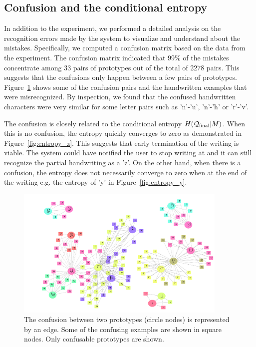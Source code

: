 \documentclass{sigchi}
\begin{document}
\subsection{Confusion and the conditional entropy}

In addition to the experiment, we performed a detailed analysis on the
recognition errors made by the system to visualize and understand
about the mistakes. Specifically, we computed a confusion matrix based
on the data from the experiment. The confusion matrix indicated that
99\% of the mistakes concentrate among 33 pairs of prototypes out of
the total of 2278 pairs. This suggests that the confusions only happen
between a few pairs of prototypes. Figure~\ref{fig:prototypes} shows
some of the confusion pairs and the handwritten examples that were
misrecognized. By inspection, we found that the confused handwritten
characters were very similar for some letter pairs such as 'n'-'u',
'n'-'h' or 'r'-'v'.

The confusion is closely related to the conditional entropy
$H(\mathcal{Q}_{\mathrm{final}} | M)$. When this is no confusion, the entropy quickly
converges to zero as demonstrated in Figure~\ref{fig:entropy_z}. This
suggests that early termination of the writing is viable. The system
could have notified the user to stop writing at  and it can
still recognize the partial handwriting as a 'z'. On the other hand,
when there is a confusion, the entropy does not necessarily converge
to zero when at the end of the writing e.g. the entropy of 'y' in
Figure~\ref{fig:entropy_y}.

\begin{figure}[!p]
  \centering
  \includegraphics[width=0.9\textwidth]{figures/confusion.pdf}
  \caption{The confusion between two prototypes (circle nodes)
    is represented by an edge. Some of the confusing examples are
    shown in square nodes. Only confusable prototypes are shown. }
  \label{fig:prototypes}
\end{figure}
\end{document}
